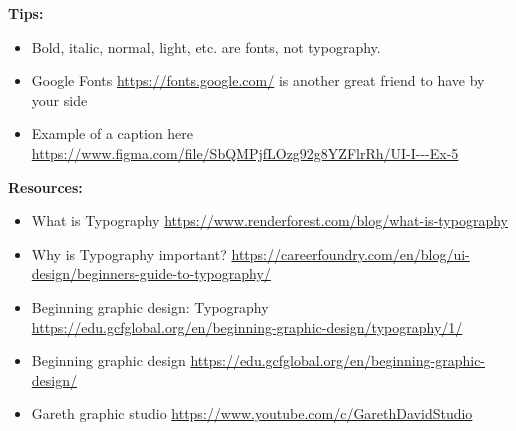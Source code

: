 \textbf{Tips:}

\begin{itemize}
\item Bold, italic, normal, light, etc. are fonts, not typography.
\item Google Fonts \url{https://fonts.google.com/} is another great friend to have by your side
\item Example of a caption here \url{https://www.figma.com/file/SbQMPjfLOzg92g8YZFlrRh/UI-I---Ex-5}
\end{itemize}

\textbf{Resources:}

\begin{itemize}
\item What is Typography \url{https://www.renderforest.com/blog/what-is-typography}
\item Why is Typography important? \url{https://careerfoundry.com/en/blog/ui-design/beginners-guide-to-typography/}
\item Beginning graphic design: Typography \url{https://edu.gcfglobal.org/en/beginning-graphic-design/typography/1/}
\item Beginning graphic design \url{https://edu.gcfglobal.org/en/beginning-graphic-design/}
\item Gareth graphic studio \url{https://www.youtube.com/c/GarethDavidStudio}
\end{itemize}

